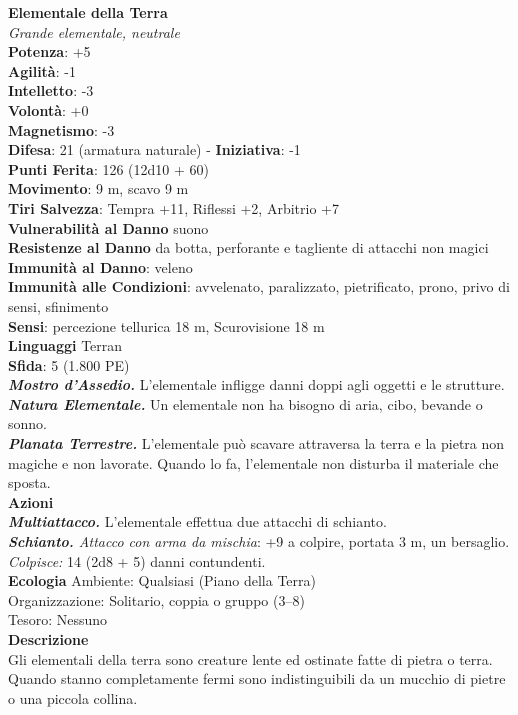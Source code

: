 \begin{multicols}{2}
\medskip\textbf{Elementale della Terra}\\
\emph{Grande elementale, neutrale}\\
\textbf{Potenza}: +5\\
\textbf{Agilità}: -1\\
\textbf{Intelletto}: -3\\
\textbf{Volontà}: +0\\
\textbf{Magnetismo}: -3\\
\textbf{Difesa}: 21 (armatura naturale) - \textbf{Iniziativa}: -1\\
\textbf{Punti Ferita}: 126 (12d10 + 60)\\
\textbf{Movimento}: 9 m, scavo 9 m\\
\textbf{Tiri Salvezza}: Tempra +11, Riflessi +2, Arbitrio +7\\
\textbf{Vulnerabilità al Danno} suono\\
\textbf{Resistenze al Danno} da botta, perforante e tagliente di attacchi non magici\\
\textbf{Immunità al Danno}: veleno\\
\textbf{Immunità alle Condizioni}: avvelenato, paralizzato, pietrificato, prono, privo di sensi, sfinimento\\
\textbf{Sensi}: percezione tellurica 18 m, Scurovisione 18 m\\
\textbf{Linguaggi} Terran\\
\textbf{Sfida}: 5 (1.800 PE)\smallskip\\
\emph{\textbf{Mostro d'Assedio.}} L'elementale infligge danni doppi agli oggetti e le strutture.\\
\emph{\textbf{Natura Elementale.}} Un elementale non ha bisogno di aria, cibo, bevande o sonno.\\
\emph{\textbf{Planata Terrestre.}} L'elementale può scavare attraversa la terra e la pietra non magiche e non lavorate. Quando lo fa, l'elementale non disturba il materiale che sposta.\\
\smallskip\textbf{Azioni}\\
\emph{\textbf{Multiattacco.}} L'elementale effettua due attacchi di schianto.\\
\emph{\textbf{Schianto.} Attacco con arma da mischia}: +9 a colpire, portata 3 m, un bersaglio.\\
\emph{Colpisce:} 14 (2d8 + 5) danni contundenti.\\
\textbf{Ecologia}
Ambiente: Qualsiasi (Piano della Terra)\\
Organizzazione: Solitario, coppia o gruppo (3–8)\\
Tesoro: Nessuno\\
\textbf{Descrizione}\\
Gli elementali della terra sono creature lente ed ostinate fatte di pietra o terra. Quando stanno completamente fermi sono indistinguibili da un mucchio di pietre o una piccola collina.\\


\end{multicols}
